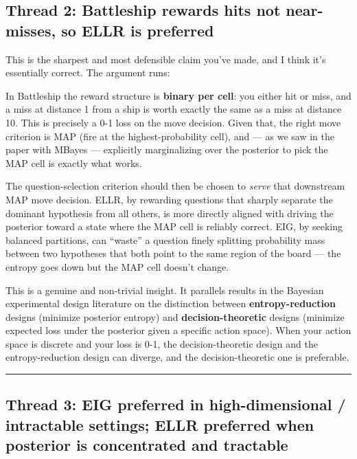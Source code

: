 \documentclass[
]{article}
\begin{document}
\subsection{Thread 2: Battleship rewards hits not near-misses, so ELLR
is
preferred}\label{thread-2-battleship-rewards-hits-not-near-misses-so-ellr-is-preferred}

This is the sharpest and most defensible claim you've made, and I think
it's essentially correct. The argument runs:

In Battleship the reward structure is \textbf{binary per cell}: you
either hit or miss, and a miss at distance 1 from a ship is worth
exactly the same as a miss at distance 10. This is precisely a 0-1 loss
on the move decision. Given that, the right move criterion is MAP (fire
at the highest-probability cell), and --- as we saw in the paper with
MBayes --- explicitly marginalizing over the posterior to pick the MAP
cell is exactly what works.

The question-selection criterion should then be chosen to \emph{serve}
that downstream MAP move decision. ELLR, by rewarding questions that
sharply separate the dominant hypothesis from all others, is more
directly aligned with driving the posterior toward a state where the MAP
cell is reliably correct. EIG, by seeking balanced partitions, can
``waste'' a question finely splitting probability mass between two
hypotheses that both point to the same region of the board --- the
entropy goes down but the MAP cell doesn't change.

This is a genuine and non-trivial insight. It parallels results in the
Bayesian experimental design literature on the distinction between
\textbf{entropy-reduction} designs (minimize posterior entropy) and
\textbf{decision-theoretic} designs (minimize expected loss under the
posterior given a specific action space). When your action space is
discrete and your loss is 0-1, the decision-theoretic design and the
entropy-reduction design can diverge, and the decision-theoretic one is
preferable.

\begin{center}\rule{0.5\linewidth}{0.5pt}\end{center}

\subsection{Thread 3: EIG preferred in high-dimensional / intractable
settings; ELLR preferred when posterior is concentrated and
tractable}\label{thread-3-eig-preferred-in-high-dimensional-intractable-settings-ellr-preferred-when-posterior-is-concentrated-and-tractable}
\end{document}

